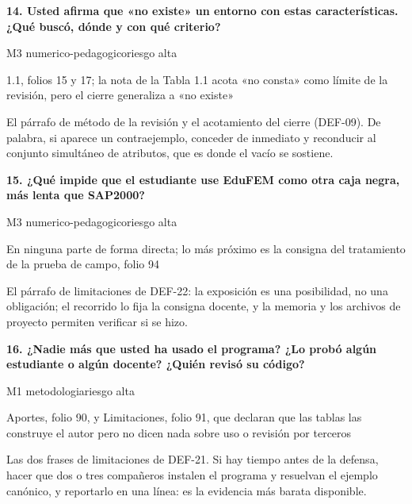 \vspace{5pt}
\noindent\casilla\textbf{14. Usted afirma que «no existe» un entorno con estas características. ¿Qué buscó, dónde y con qué criterio?}\par
{\small\color{gris}\sffamily M3 numerico-pedagogico\quad{}\quad riesgo alta}\par
{\small{}1.1, folios 15 y 17; la nota de la Tabla 1.1 acota «no consta» como límite de la revisión, pero el cierre generaliza a «no existe»\par}
{\small{}El párrafo de método de la revisión y el acotamiento del cierre (DEF-09). De palabra, si aparece un contraejemplo, conceder de inmediato y reconducir al conjunto simultáneo de atributos, que es donde el vacío se sostiene.\par}
\vspace{5pt}
\noindent\casilla\textbf{15. ¿Qué impide que el estudiante use EduFEM como otra caja negra, más lenta que SAP2000?}\par
{\small\color{gris}\sffamily M3 numerico-pedagogico\quad{}\quad riesgo alta}\par
{\small{}En ninguna parte de forma directa; lo más próximo es la consigna del tratamiento de la prueba de campo, folio 94\par}
{\small{}El párrafo de limitaciones de DEF-22: la exposición es una posibilidad, no una obligación; el recorrido lo fija la consigna docente, y la memoria y los archivos de proyecto permiten verificar si se hizo.\par}
\vspace{5pt}
\noindent\casilla\textbf{16. ¿Nadie más que usted ha usado el programa? ¿Lo probó algún estudiante o algún docente? ¿Quién revisó su código?}\par
{\small\color{gris}\sffamily M1 metodologia\quad{}\quad riesgo alta}\par
{\small{}Aportes, folio 90, y Limitaciones, folio 91, que declaran que las tablas las construye el autor pero no dicen nada sobre uso o revisión por terceros\par}
{\small{}Las dos frases de limitaciones de DEF-21. Si hay tiempo antes de la defensa, hacer que dos o tres compañeros instalen el programa y resuelvan el ejemplo canónico, y reportarlo en una línea: es la evidencia más barata disponible.\par}
